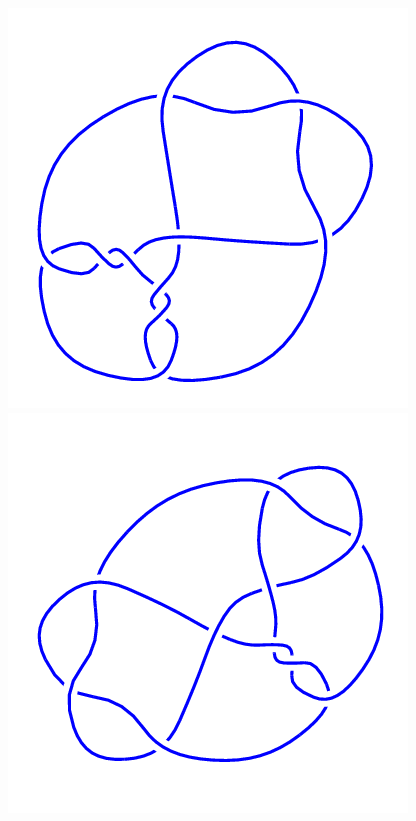 \begin{figure}[H]
\begin{minipage}[b]{.18\linewidth}
	\end{minipage}
	\begin{minipage}[b]{.18\linewidth}
		\centering
		\includegraphics[width=\linewidth]{../data/10_64.png}
	\end{minipage}
	\begin{minipage}[b]{.18\linewidth}
		\centering
		\includegraphics[width=\linewidth]{../data/10_65.png}

\end{minipage}
\end{figure}
